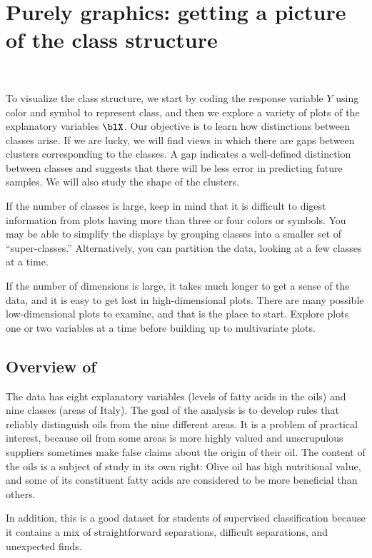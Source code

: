 \section{Purely graphics: getting a picture of the class structure}~\label{class-plots}

To visualize the class structure, we start by coding the response
variable $Y$ using color and symbol to represent class, and then
we explore a variety of plots of the explanatory variables $\blX$.  Our
objective is to learn how distinctions between classes arise.  If we
are lucky, we will find views in which there are gaps between clusters
corresponding to the classes. A gap indicates a well-defined
distinction between classes and suggests that there will be less
error in predicting future samples.  We will also study the shape of
the clusters.

If the number of classes is large, keep in mind that it is difficult
to digest information from plots having more than three or four colors
or symbols.  You may be able to simplify the displays by grouping
classes into a smaller set of ``super-classes.''  Alternatively, you can
partition the data, looking at a few classes at a time.

If the number of dimensions is large, it takes much longer to get a
sense of the data, and it is easy to get lost in high-dimensional
plots. There are many possible low-dimensional plots to examine, and
that is the place to start.  Explore plots one or two variables at a
time before building up to multivariate plots.

\subsection{Overview of }

The  data has eight explanatory variables (levels of
fatty acids in the oils) and nine classes (areas of Italy).  The goal
of the analysis is to develop rules that reliably distinguish oils
from the nine different areas.  It is a problem of practical interest,
because oil from some areas is more highly valued and unscrupulous
suppliers sometimes make false claims about the origin of their oil.
The content of the oils is a subject of study in its own right: Olive
oil has high nutritional value, and some of its constituent fatty
acids are considered to be more beneficial than others.

In addition, this is a good dataset for students of supervised
classification because it contains a mix of straightforward
separations, difficult separations, and unexpected finds.

